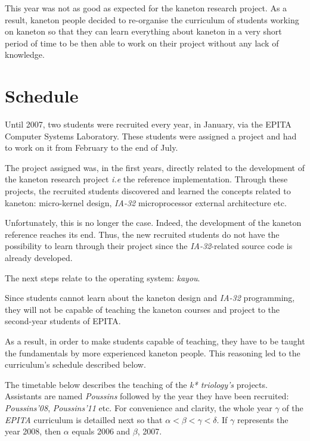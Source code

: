 \begin{multicols}{2}
This year was not as good as expected for the kaneton research project. As a
result, kaneton people decided to re-organise the curriculum of students
working on kaneton so that they can learn everything about kaneton in a very
short period of time to be then able to work on their project without any
lack of knowledge.

%
%

\section{Schedule}

Until 2007, two students were recruited every year, in January, via the EPITA
Computer Systems Laboratory. These students were assigned a project and had
to work on it from February to the end of July.

The project assigned was, in the first years, directly related to the
development of the kaneton research project \textit{i.e} the reference
implementation. Through these projects, the recruited students discovered
and learned the concepts related to kaneton: micro-kernel design,
\textit{IA-32} microprocessor external architecture etc.

Unfortunately, this is no longer the case. Indeed, the development of the
kaneton reference reaches its end. Thus, the new recruited students do not
have the possibility to learn through their project since the
\textit{IA-32}-related source code is already developed.

The next steps relate to the operating system: \textit{kayou}.

Since students cannot learn about the kaneton design and \textit{IA-32}
programming, they will not be capable of teaching the kaneton courses and
project to the second-year students of EPITA.

As a result, in order to make students capable of teaching, they have to
be taught the fundamentals by more experienced kaneton people. This reasoning
led to the curriculum's schedule described below.

The timetable below describes the teaching of the \textit{k* triology's}
projects. Assistants are named \textit{Poussins} followed by the year
they have been recruited: \textit{Poussins'08}, \textit{Poussins'11} etc.
For convenience and clarity, the whole year $\gamma$ of the \textit{EPITA}
curriculum is detailled next so that $\alpha < \beta < \gamma < \delta$. If
$\gamma$ represents the year 2008, then $\alpha$ equals 2006 and $\beta$, 2007.


\end{multicols}
